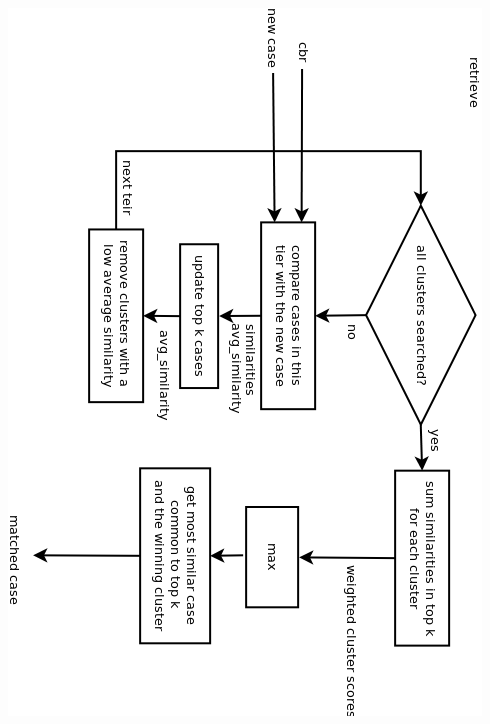 \documentclass[11pt]{article}
\begin{document}
\includegraphics[width=\linewidth,height=\textheight,keepaspectratio]{retrieve.png}
\newpage
\end{document}
